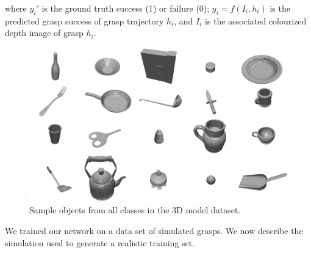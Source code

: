 where $y_i'$ is the ground truth success (1) or failure (0); $y_i = f(I_i, h_i)$ is the predicted grasp success of grasp trajectory $h_i$, and $I_i$ is the associated colourized depth image of grasp $h_i$.
\begin{figure}
\begin{center}
  \includegraphics[width=0.9\linewidth]{images/allObjects-small.pdf}
  \end{center}
  \caption{Sample objects from all classes in the 3D model dataset.}
  \label{fig:allObjects}
\end{figure}
We trained our network on a data set of simulated grasps. We now describe the simulation used to generate a realistic training set. %


